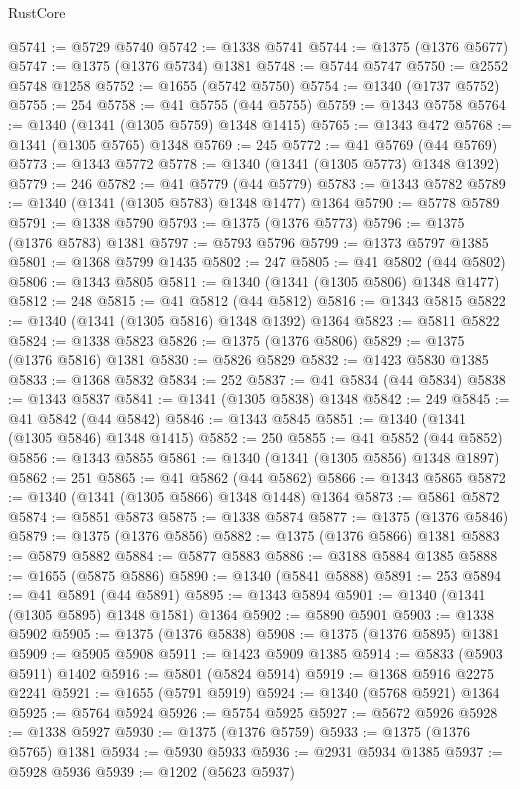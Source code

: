 \begin{lexlean}{RustCore}
\begin{coremodule}
@5741 := @5729 @5740
@5742 := @1338 @5741
@5744 := @1375 (@1376 @5677)
@5747 := @1375 (@1376 @5734) @1381
@5748 := @5744 @5747
@5750 := @2552 @5748 @1258
@5752 := @1655 (@5742 @5750)
@5754 := @1340 (@1737 @5752)
@5755 := 254
@5758 := @41 @5755 (@44 @5755)
@5759 := @1343 @5758
@5764 := @1340 (@1341 (@1305 @5759) @1348 @1415)
@5765 := @1343 @472
@5768 := @1341 (@1305 @5765) @1348
@5769 := 245
@5772 := @41 @5769 (@44 @5769)
@5773 := @1343 @5772
@5778 := @1340 (@1341 (@1305 @5773) @1348 @1392)
@5779 := 246
@5782 := @41 @5779 (@44 @5779)
@5783 := @1343 @5782
@5789 := @1340 (@1341 (@1305 @5783) @1348 @1477) @1364
@5790 := @5778 @5789
@5791 := @1338 @5790
@5793 := @1375 (@1376 @5773)
@5796 := @1375 (@1376 @5783) @1381
@5797 := @5793 @5796
@5799 := @1373 @5797 @1385
@5801 := @1368 @5799 @1435
@5802 := 247
@5805 := @41 @5802 (@44 @5802)
@5806 := @1343 @5805
@5811 := @1340 (@1341 (@1305 @5806) @1348 @1477)
@5812 := 248
@5815 := @41 @5812 (@44 @5812)
@5816 := @1343 @5815
@5822 := @1340 (@1341 (@1305 @5816) @1348 @1392) @1364
@5823 := @5811 @5822
@5824 := @1338 @5823
@5826 := @1375 (@1376 @5806)
@5829 := @1375 (@1376 @5816) @1381
@5830 := @5826 @5829
@5832 := @1423 @5830 @1385
@5833 := @1368 @5832
@5834 := 252
@5837 := @41 @5834 (@44 @5834)
@5838 := @1343 @5837
@5841 := @1341 (@1305 @5838) @1348
@5842 := 249
@5845 := @41 @5842 (@44 @5842)
@5846 := @1343 @5845
@5851 := @1340 (@1341 (@1305 @5846) @1348 @1415)
@5852 := 250
@5855 := @41 @5852 (@44 @5852)
@5856 := @1343 @5855
@5861 := @1340 (@1341 (@1305 @5856) @1348 @1897)
@5862 := 251
@5865 := @41 @5862 (@44 @5862)
@5866 := @1343 @5865
@5872 := @1340 (@1341 (@1305 @5866) @1348 @1448) @1364
@5873 := @5861 @5872
@5874 := @5851 @5873
@5875 := @1338 @5874
@5877 := @1375 (@1376 @5846)
@5879 := @1375 (@1376 @5856)
@5882 := @1375 (@1376 @5866) @1381
@5883 := @5879 @5882
@5884 := @5877 @5883
@5886 := @3188 @5884 @1385
@5888 := @1655 (@5875 @5886)
@5890 := @1340 (@5841 @5888)
@5891 := 253
@5894 := @41 @5891 (@44 @5891)
@5895 := @1343 @5894
@5901 := @1340 (@1341 (@1305 @5895) @1348 @1581) @1364
@5902 := @5890 @5901
@5903 := @1338 @5902
@5905 := @1375 (@1376 @5838)
@5908 := @1375 (@1376 @5895) @1381
@5909 := @5905 @5908
@5911 := @1423 @5909 @1385
@5914 := @5833 (@5903 @5911) @1402
@5916 := @5801 (@5824 @5914)
@5919 := @1368 @5916 @2275 @2241
@5921 := @1655 (@5791 @5919)
@5924 := @1340 (@5768 @5921) @1364
@5925 := @5764 @5924
@5926 := @5754 @5925
@5927 := @5672 @5926
@5928 := @1338 @5927
@5930 := @1375 (@1376 @5759)
@5933 := @1375 (@1376 @5765) @1381
@5934 := @5930 @5933
@5936 := @2931 @5934 @1385
@5937 := @5928 @5936
@5939 := @1202 (@5623 @5937)

\end{coremodule}
\end{lexlean}
